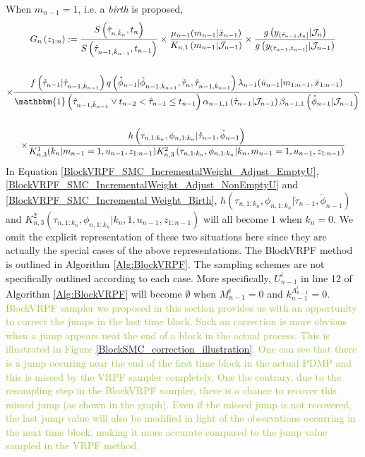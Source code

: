 \documentclass[12pt,a4paper]{article}
\begin{document}
When $m_{n-1} = 1$, i.e. a \textit{birth} is proposed, 
\begin{multline}
    \label{BlockVRPF_SMC_Incremental Weight_Birth}
    G_{n}\left(z_{1:n}\right) := \frac{S\left(\hat{\tau}_{n,\hat{k}_n},t_n\right)}{S\left(\hat{\tau}_{n-1,\hat{k}_{n-1}},t_{n-1}\right)} \times \frac{\mu_{n-1}(m_{n-1}|\bar{x}_{n-1})}{K_{n,1}\left(m_{n-1}|\mathcal{J}_{n-1}\right)}\times \frac{g\left(y_{(\mathring{\tau}_{n-1},t_n]}|\mathcal{J}_n\right)}{g\left(y_{(\mathring{\tau}_{n-1},t_{n-1}]}|\mathcal{J}_{n-1}\right)}\\\\
    \times \frac{f\left(\mathring{\tau}_{n-1}|\hat{\tau}_{n-1,\hat{k}_{n-1}}\right)q\left(\mathring{\phi}_{n-1}|\hat{\phi}_{n-1,\hat{k}_{n-1}},\mathring{\tau}_{n},\hat{\tau}_{n-1,\hat{k}_{n-1}}\right)\lambda_{n-1}(\bar{u}_{n-1}|m_{1:n-1},\bar{x}_{1:n-1})}{\mathbbm{1}\left(\hat{\tau}_{n-1,\hat{k}_{n-1}} \vee t_{n-2}  < \mathring{\tau}_{n-1} \leq t_{n-1} \right)\alpha_{n-1,1}\left(\mathring{\tau}_{n-1}|\mathcal{J}_{n-1}\right)\beta_{n-1,1}\left(\mathring{\phi}_{n-1}|\mathcal{J}_{n-1}\right)}\\\\
    \times \frac{h\left(\tau_{n,1:k_n},\phi_{n,1:k_n}|\mathring{\tau}_{n-1},\mathring{\phi}_{n-1}\right)}{K_{n,3}^1(k_n|m_{n-1}=1,u_{n-1},z_{1:n-1})K_{n,3}^{2}\left(\tau_{n,1:k_n},\phi_{n,1:k_n}|k_n,m_{n-1}=1,u_{n-1},z_{1:n-1}\right)}
\end{multline}
In Equation \eqref{BlockVRPF_SMC_IncrementalWeight_Adjust_EmptyU}, \eqref{BlockVRPF_SMC_IncrementalWeight_Adjust_NonEmptyU} and \eqref{BlockVRPF_SMC_Incremental Weight_Birth}, $h\left(\tau_{n,1:k_n},\phi_{n,1:k_n}|\mathring{\tau}_{n-1},\mathring{\phi}_{n-1}\right)$ and $K_{n,3}^{2}\left(\tau_{n,1:k_n},\phi_{n,1:k_n}|k_n,1,u_{n-1},z_{1:n-1}\right)$ will all become $1$ when $k_n=0$. We omit the explicit representation of these two situations here since they are actually the special cases of the above representations. 
The BlockVRPF method is outlined in Algorithm \ref{Alg:BlockVRPF}. The sampling schemes are not specifically outlined according to each case. More specifically, $U_{n-1}^i$ in line 12 of Algorithm \ref{Alg:BlockVRPF} will become $\emptyset$ when $M_{n-1}^i = 0$ and $k_{n-1}^{A_{n-1}^i} = 0$. \textcolor{YellowGreen}
{BlockVRPF sampler we proposed in this section provides us with an opportunity to correct the jumps in the last time block. Such an correction is more obvious when a jump appears neat the end of a block in the actual process. This is illustrated in Figure \ref{BlockSMC_correction_illustration}. One can see that there is a jump occuring near the end of the first time block in the actual PDMP and this is missed by the VRPF sampler completely. One the contrary, due to the resampling step in the BlockVRPF sampler, there is a chance to recover this missed jump (as shown in the graph). Even if the missed jump is not recovered, the last jump value will also be modified in light of the observations occurring in the next time block, making it more accurate compared to the jump value sampled in the VRPF method.}
\end{document}
